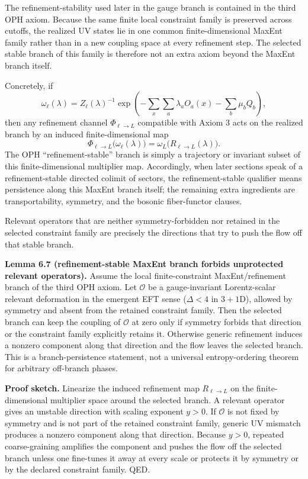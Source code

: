 The refinement-stability used later in the gauge branch is contained in the third OPH axiom. Because the same finite local constraint family is preserved across cutoffs, the realized UV states lie in one common finite-dimensional MaxEnt family rather than in a new coupling space at every refinement step. The selected stable branch of this family is therefore not an extra axiom beyond the MaxEnt branch itself.

Concretely, if
\[
\omega_\ell(\lambda)
=
Z_\ell(\lambda)^{-1}
\exp\!\left(
-\sum_x \sum_a \lambda_a O_a(x)-\sum_b \mu_b Q_b
\right),
\]
then any refinement channel \(\Phi_{\ell\to L}\) compatible with Axiom 3 acts on the realized branch by an induced finite-dimensional map
\[
\Phi_{\ell\to L}\bigl(\omega_\ell(\lambda)\bigr)
=
\omega_L\!\bigl(R_{\ell\to L}(\lambda)\bigr).
\]
The OPH ``refinement-stable'' branch is simply a trajectory or invariant subset of this finite-dimensional multiplier map. Accordingly, when later sections speak of a refinement-stable directed colimit of sectors, the refinement-stable qualifier means persistence along this MaxEnt branch itself; the remaining extra ingredients are transportability, symmetry, and the bosonic fiber-functor clauses.

Relevant operators that are neither symmetry-forbidden nor retained in the selected constraint family are precisely the directions that try to push the flow off that stable branch.

\textbf{Lemma 6.7 (refinement-stable MaxEnt branch forbids unprotected relevant operators).} Assume the local finite-constraint MaxEnt/refinement branch of the third OPH axiom. Let \(\mathcal{O}\) be a gauge-invariant Lorentz-scalar relevant deformation in the emergent EFT sense (\(\Delta<4\) in \(3+1\)D), allowed by symmetry and absent from the retained constraint family. Then the selected branch can keep the coupling of \(\mathcal{O}\) at zero only if symmetry forbids that direction or the constraint family explicitly retains it. Otherwise generic refinement induces a nonzero component along that direction and the flow leaves the selected branch. This is a branch-persistence statement, not a universal entropy-ordering theorem for arbitrary off-branch phases.

\textbf{Proof sketch.} Linearize the induced refinement map \(R_{\ell\to L}\) on the finite-dimensional multiplier space around the selected branch. A relevant operator gives an unstable direction with scaling exponent \(y>0\). If \(\mathcal{O}\) is not fixed by symmetry and is not part of the retained constraint family, generic UV mismatch produces a nonzero component along that direction. Because \(y>0\), repeated coarse-graining amplifies the component and pushes the flow off the selected branch unless one fine-tunes it away at every scale or protects it by symmetry or by the declared constraint family. QED.

